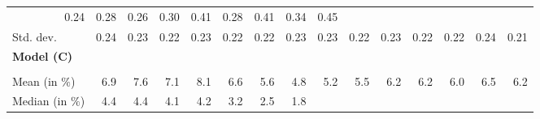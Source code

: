 \begin{tabular}{lllllllllllllll}
  \multicolumn{1}{r}{0.24} &
  \multicolumn{1}{r}{0.28} &
  \multicolumn{1}{r}{0.26} &
  \multicolumn{1}{r}{0.30} &
  \multicolumn{1}{r}{0.41} &
  \multicolumn{1}{r}{0.28} &
  \multicolumn{1}{r}{0.41} &
  \multicolumn{1}{r}{0.34} &
  \multicolumn{1}{r}{0.45} \\
\multicolumn{1}{l}{\hspace{2em}Std. dev.} &
  \multicolumn{1}{|r}{0.24} &
  \multicolumn{1}{r}{0.23} &
  \multicolumn{1}{r}{0.22} &
  \multicolumn{1}{r}{0.23} &
  \multicolumn{1}{r}{0.22} &
  \multicolumn{1}{r}{0.22} &
  \multicolumn{1}{r}{0.23} &
  \multicolumn{1}{r}{0.23} &
  \multicolumn{1}{r}{0.22} &
  \multicolumn{1}{r}{0.23} &
  \multicolumn{1}{r}{0.22} &
  \multicolumn{1}{r}{0.22} &
  \multicolumn{1}{r}{0.24} &
  \multicolumn{1}{r}{0.21} \\
\multicolumn{1}{l}{{\textbf{Model (C)}}} &
  \multicolumn{1}{|r}{} &
  \multicolumn{1}{r}{} &
  \multicolumn{1}{r}{} &
  \multicolumn{1}{r}{} &
  \multicolumn{1}{r}{} &
  \multicolumn{1}{r}{} &
  \multicolumn{1}{r}{} &
  \multicolumn{1}{r}{} &
  \multicolumn{1}{r}{} &
  \multicolumn{1}{r}{} &
  \multicolumn{1}{r}{} &
  \multicolumn{1}{r}{} &
  \multicolumn{1}{r}{} &
  \multicolumn{1}{r}{} \\
\multicolumn{1}{l}{\hspace{1em}{\textit{Additive term} ($\widehat{t}^{add}/\widetilde{p}$)}} &
  \multicolumn{1}{|r}{} &
  \multicolumn{1}{r}{} &
  \multicolumn{1}{r}{} &
  \multicolumn{1}{r}{} &
  \multicolumn{1}{r}{} &
  \multicolumn{1}{r}{} &
  \multicolumn{1}{r}{} &
  \multicolumn{1}{r}{} &
  \multicolumn{1}{r}{} &
  \multicolumn{1}{r}{} &
  \multicolumn{1}{r}{} &
  \multicolumn{1}{r}{} &
  \multicolumn{1}{r}{} &
  \multicolumn{1}{r}{} \\
\multicolumn{1}{l}{\hspace{2em}Mean (in $\%$)} &
  \multicolumn{1}{|r}{6.9} &
  \multicolumn{1}{r}{7.6} &
  \multicolumn{1}{r}{7.1} &
  \multicolumn{1}{r}{8.1} &
  \multicolumn{1}{r}{6.6} &
  \multicolumn{1}{r}{5.6} &
  \multicolumn{1}{r}{4.8} &
  \multicolumn{1}{r}{5.2} &
  \multicolumn{1}{r}{5.5} &
  \multicolumn{1}{r}{6.2} &
  \multicolumn{1}{r}{6.2} &
  \multicolumn{1}{r}{6.0} &
  \multicolumn{1}{r}{6.5} &
  \multicolumn{1}{r}{6.2} \\
\multicolumn{1}{l}{\hspace{2em}Median (in $\%$)} &
  \multicolumn{1}{|r}{4.4} &
  \multicolumn{1}{r}{4.4} &
  \multicolumn{1}{r}{4.1} &
  \multicolumn{1}{r}{4.2} &
  \multicolumn{1}{r}{3.2} &
  \multicolumn{1}{r}{2.5} &
  \multicolumn{1}{r}{1.8} &

\end{tabular}
